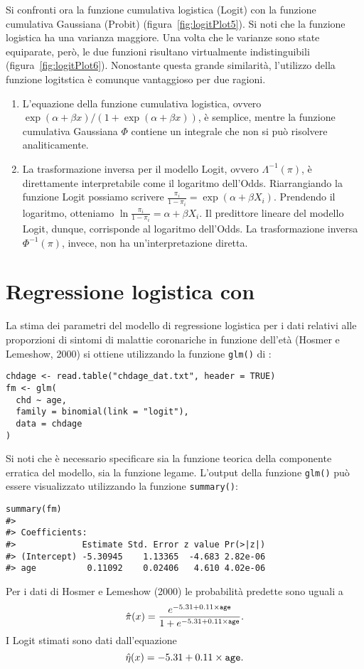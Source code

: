 Si confronti ora la funzione cumulativa logistica (Logit) con  la funzione cumulativa Gaussiana (Probit) (figura~\ref{fig:logitPlot5}). 
Si noti che la funzione logistica ha una varianza maggiore.
Una volta che le varianze sono state equiparate, però, le due funzioni risultano virtualmente indistinguibili (figura~\ref{fig:logitPlot6}).
Nonostante questa grande similarità, l'utilizzo della funzione logitstica è comunque vantaggioso per due ragioni.
\begin{enumerate}
\item L'equazione della funzione cumulativa logistica, ovvero $\exp(\alpha + \beta x)/(1+\exp(\alpha + \beta x))$, è semplice, mentre la funzione cumulativa Gaussiana $\Phi$ contiene un integrale che non si può risolvere analiticamente.
\item La trasformazione inversa per il modello Logit, ovvero $\Lambda^{-1}(\pi)$, è direttamente interpretabile come il logaritmo dell'Odds.
Riarrangiando la funzione Logit possiamo scrivere
$
\frac{\pi_i}{1-\pi_i} = \exp(\alpha + \beta X_i).
$
Prendendo il logaritmo, otteniamo
$
\ln \frac{\pi_i}{1-\pi_i} = \alpha + \beta X_i.
$
Il predittore lineare del modello Logit, dunque, corrisponde al logaritmo dell'Odds.
La trasformazione inversa $\Phi^{-1}(\pi)$, invece, non ha un'interpretazione diretta.
\end{enumerate}

\section{Regressione logistica con \R}

La stima dei parametri del modello di regressione logistica per i dati relativi alle proporzioni di sintomi di malattie coronariche in funzione dell'età (Hosmer e Lemeshow, 2000) si ottiene utilizzando la funzione {\tt glm()} di \R: 

\begin{lstlisting}
chdage <- read.table("chdage_dat.txt", header = TRUE)
fm <- glm(
  chd ~ age, 
  family = binomial(link = "logit"), 
  data = chdage
)
\end{lstlisting}
Si noti che è necessario specificare sia la funzione teorica della componente erratica del modello, sia la funzione legame. 
L'output della funzione {\tt glm()} può essere visualizzato utilizzando la funzione \texttt{summary()}:
\begin{lstlisting}
summary(fm)
#> 
#> Coefficients:
#>             Estimate Std. Error z value Pr(>|z|)    
#> (Intercept) -5.30945    1.13365  -4.683 2.82e-06 
#> age          0.11092    0.02406   4.610 4.02e-06 
\end{lstlisting}
Per i dati di Hosmer e Lemeshow (2000) le probabilità predette sono uguali a
$$
\hat{\pi}(x)=\frac{e^{-5.31 + 0.11 \times {\tt age}}}{1+e^{-5.31 + 0.11 \times {\tt age}}}.
$$
I Logit stimati sono dati dall'equazione 
$$
\hat{\eta}(x)=-5.31 + 0.11 \times {\tt age}.
$$

